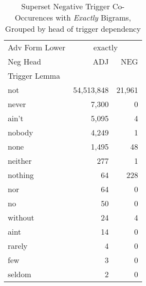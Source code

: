 
\begin{table}[ht]
\caption{Superset Negative Trigger Co-Occurences with \textit{Exactly} Bigrams,\\Grouped by head of trigger dependency}
\label{trig-exactly-head-f}
\begin{tabular}{lrr}
\toprule
Adv Form Lower & \multicolumn{2}{c}{exactly} \\
Neg Head & ADJ & NEG \\
Trigger Lemma &  &  \\
\midrule
not & {\cellcolor[HTML]{023858}} \color[HTML]{F1F1F1} 54,513,848 & {\cellcolor[HTML]{04598C}} \color[HTML]{F1F1F1} 21,961 \\
never & {\cellcolor[HTML]{C2CBE2}} \color[HTML]{000000} 7,300 & {\cellcolor[HTML]{FFF7FB}} \color[HTML]{000000} 0 \\
ain't & {\cellcolor[HTML]{DAD9EA}} \color[HTML]{000000} 5,095 & {\cellcolor[HTML]{FFF7FB}} \color[HTML]{000000} 4 \\
nobody & {\cellcolor[HTML]{E2DFEE}} \color[HTML]{000000} 4,249 & {\cellcolor[HTML]{FFF7FB}} \color[HTML]{000000} 1 \\
none & {\cellcolor[HTML]{F6EFF7}} \color[HTML]{000000} 1,495 & {\cellcolor[HTML]{FFF7FB}} \color[HTML]{000000} 48 \\
neither & {\cellcolor[HTML]{FEF6FA}} \color[HTML]{000000} 277 & {\cellcolor[HTML]{FFF7FB}} \color[HTML]{000000} 1 \\
nothing & {\cellcolor[HTML]{FFF7FB}} \color[HTML]{000000} 64 & {\cellcolor[HTML]{FEF6FA}} \color[HTML]{000000} 228 \\
nor & {\cellcolor[HTML]{FFF7FB}} \color[HTML]{000000} 64 & {\cellcolor[HTML]{FFF7FB}} \color[HTML]{000000} 0 \\
no & {\cellcolor[HTML]{FFF7FB}} \color[HTML]{000000} 50 & {\cellcolor[HTML]{FFF7FB}} \color[HTML]{000000} 0 \\
without & {\cellcolor[HTML]{FFF7FB}} \color[HTML]{000000} 24 & {\cellcolor[HTML]{FFF7FB}} \color[HTML]{000000} 4 \\
aint & {\cellcolor[HTML]{FFF7FB}} \color[HTML]{000000} 14 & {\cellcolor[HTML]{FFF7FB}} \color[HTML]{000000} 0 \\
rarely & {\cellcolor[HTML]{FFF7FB}} \color[HTML]{000000} 4 & {\cellcolor[HTML]{FFF7FB}} \color[HTML]{000000} 0 \\
few & {\cellcolor[HTML]{FFF7FB}} \color[HTML]{000000} 3 & {\cellcolor[HTML]{FFF7FB}} \color[HTML]{000000} 0 \\
seldom & {\cellcolor[HTML]{FFF7FB}} \color[HTML]{000000} 2 & {\cellcolor[HTML]{FFF7FB}} \color[HTML]{000000} 0 \\
\bottomrule
\end{tabular}
\end{table}
